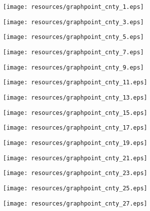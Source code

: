 \documentclass[12pt]{article}
\begin{document}
\begin{figure}[H]
	\centering
	\texttt{[image: resources/graphpoint\_cnty\_1.eps]}
\end{figure}

\begin{figure}[H]
	\centering
	\texttt{[image: resources/graphpoint\_cnty\_3.eps]}
\end{figure}

\begin{figure}[H]
	\centering
	\texttt{[image: resources/graphpoint\_cnty\_5.eps]}
\end{figure}

\begin{figure}[H]
	\centering
	\texttt{[image: resources/graphpoint\_cnty\_7.eps]}
\end{figure}

\begin{figure}[H]
	\centering
	\texttt{[image: resources/graphpoint\_cnty\_9.eps]}
\end{figure}

\begin{figure}[H]
	\centering
	\texttt{[image: resources/graphpoint\_cnty\_11.eps]}
\end{figure}

\begin{figure}[H]
	\centering
	\texttt{[image: resources/graphpoint\_cnty\_13.eps]}
\end{figure}

\begin{figure}[H]
	\centering
	\texttt{[image: resources/graphpoint\_cnty\_15.eps]}
\end{figure}

\begin{figure}[H]
	\centering
	\texttt{[image: resources/graphpoint\_cnty\_17.eps]}
\end{figure}

\begin{figure}[H]
	\centering
	\texttt{[image: resources/graphpoint\_cnty\_19.eps]}
\end{figure}

\begin{figure}[H]
	\centering
	\texttt{[image: resources/graphpoint\_cnty\_21.eps]}
\end{figure}

\begin{figure}[H]
	\centering
	\texttt{[image: resources/graphpoint\_cnty\_23.eps]}
\end{figure}

\begin{figure}[H]
	\centering
	\texttt{[image: resources/graphpoint\_cnty\_25.eps]}
\end{figure}

\begin{figure}[H]
	\centering
	\texttt{[image: resources/graphpoint\_cnty\_27.eps]}
\end{figure}
\end{document}
